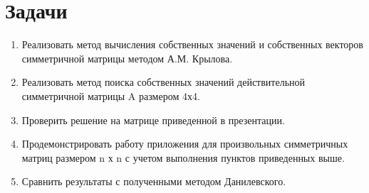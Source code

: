 \documentclass[a4paper, 14pt]{extarticle}
\begin{document}
\section{Задачи}\label{Sect::task}
\par
\renewcommand{\labelenumii}{\arabic{enumi}.\arabic{enumii}.}
\begin{enumerate} 
    \item Реализовать метод вычисления собственных значений и собственных векторов симметричной матрицы методом А.М. Крылова.
    \item Реализовать метод поиска собственных значений действительной симметричной матрицы A размером 4х4.
    \item Проверить решение на матрице приведенной в презентации.
    \item Продемонстрировать работу приложения для произвольных симметричных матриц размером n х n с учетом выполнения пунктов приведенных выше.
    \item Сравнить результаты с полученными методом Данилевского.
\end{enumerate}

\pagebreak
\end{document}

